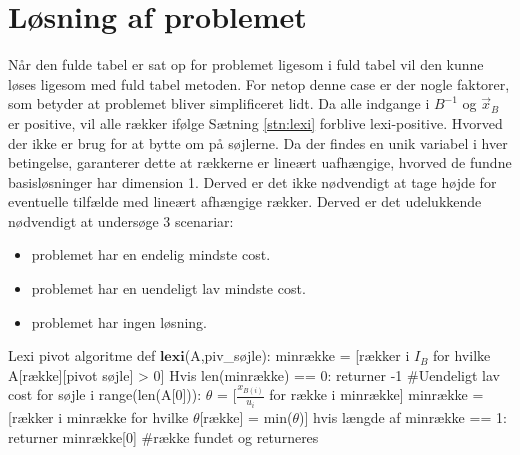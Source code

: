 \section{Løsning af problemet}
Når den fulde tabel er sat op for problemet ligesom i fuld tabel vil den kunne løses ligesom med fuld tabel metoden.
For netop denne case er der nogle faktorer, som betyder at problemet bliver simplificeret lidt.
Da alle indgange i $B^{-1}$ og $\vec{x}_B$ er positive, vil alle rækker ifølge Sætning \ref{stn:lexi} forblive lexi-positive. Hvorved der ikke er brug for at bytte om på søjlerne.
Da der findes en unik variabel i hver betingelse, garanterer dette at rækkerne er lineært uafhængige, hvorved de fundne basisløsninger har dimension 1. Derved er det ikke nødvendigt at tage højde for eventuelle tilfælde med lineært afhængige rækker. Derved er det udelukkende nødvendigt at undersøge 3 scenariar: 
\begin{itemize}
\item problemet har en endelig mindste cost. \item problemet har en uendeligt lav mindste cost.
\item problemet har ingen løsning.
\end{itemize}

\newpage

\begin{alg}[label={alg:lexi}]{Lexi pivot algoritme}
def $\textbf{lexi}$(A,piv_søjle):
	minrække = [rækker i $I_B$ for hvilke A[række][pivot søjle] > 0]
	Hvis len(minrække) == 0:
		returner -1 #Uendeligt lav cost
	for søjle i range(len(A[0])):
		$\theta$ = [$\frac{x_{B(i)}}{u_i}$ for række i minrække]
		minrække = [rækker i minrække for hvilke $\theta$[række] = min($\theta$)]
		hvis længde af minrække == 1:
			returner minrække[0] #række fundet og returneres

\end{alg}


